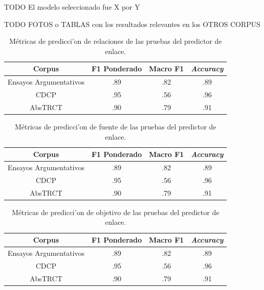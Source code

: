 TODO El modelo seleccionado fue X por Y

TODO FOTOS o TABLAS con los resultados relevantes en los OTROS CORPUS

\begin{table}[h!]
	\begin{center}
		\begin{tabular}{|c|c|c|c|} \hline
        Corpus		            & F1 Ponderado  & Macro F1 & \emph{Accuracy} \\ \hline
        Ensayos Argumentativos  & .89           & .82	   & .89             \\ \hline
        CDCP		            & .95           & .56	   & .96	         \\ \hline
        AbsTRCT	                & .90           & .79	   & .91	         \\ \hline
        \end{tabular}
	\caption{Métricas de predicci'on de relaciones de las pruebas del predictor de enlace.}\label{table:test_relation_metrics_link_predictor}
	\end{center}
\end{table}

\begin{table}[h!]
	\begin{center}
		\begin{tabular}{|c|c|c|c|} \hline
        Corpus		            & F1 Ponderado  & Macro F1 & \emph{Accuracy} \\ \hline
        Ensayos Argumentativos  & .89           & .82	   & .89             \\ \hline
        CDCP		            & .95           & .56	   & .96	         \\ \hline
        AbsTRCT	                & .90           & .79	   & .91	         \\ \hline
        \end{tabular}
	\caption{Métricas de predicci'on de fuente de las pruebas del predictor de enlace.}\label{table:test_source_metrics_link_predictor}
	\end{center}
\end{table}

\begin{table}[h!]
	\begin{center}
		\begin{tabular}{|c|c|c|c|} \hline
        Corpus		            & F1 Ponderado  & Macro F1 & \emph{Accuracy} \\ \hline
        Ensayos Argumentativos  & .89           & .82	   & .89             \\ \hline
        CDCP		            & .95           & .56	   & .96	         \\ \hline
        AbsTRCT	                & .90           & .79	   & .91	         \\ \hline
        \end{tabular}
	\caption{Métricas de predicci'on de objetivo de las pruebas del predictor de enlace.}\label{table:test_source_metrics_link_predictor}
	\end{center}
\end{table}

